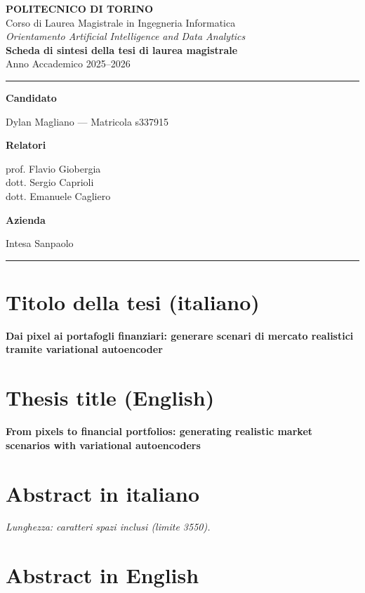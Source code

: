\documentclass[11pt,a4paper]{article}
\newcommand{\campo}[2]{%
  \par\noindent\parbox[t]{0.30\textwidth}{\raggedright\bfseries #1}%
  \parbox[t]{0.68\textwidth}{\raggedright #2}\par\medskip}
\begin{document}
\begin{center}
  {\Large\bfseries\color{polito} POLITECNICO DI TORINO}\\[0.35em]
  {\normalsize Corso di Laurea Magistrale in Ingegneria Informatica}\\
  {\small\itshape Orientamento Artificial Intelligence and Data Analytics}\\[1.2em]
  {\large\bfseries Scheda di sintesi della tesi di laurea magistrale}\\[0.4em]
  {\small Anno Accademico 2025--2026}
\end{center}

\vspace{0.6em}
\noindent\textcolor{rulegray}{\rule{\textwidth}{0.8pt}}
\vspace{0.4em}

\campo{Candidato}{Dylan Magliano --- Matricola s337915}
\campo{Relatori}{prof. Flavio Giobergia\\ dott. Sergio Caprioli\\ dott. Emanuele Cagliero}
\campo{Azienda}{Intesa Sanpaolo}

\noindent\textcolor{rulegray}{\rule{\textwidth}{0.8pt}}

\section{Titolo della tesi (italiano)}

\textbf{Dai pixel ai portafogli finanziari: generare scenari di mercato
realistici tramite variational autoencoder}

\section{Thesis title (English)}

\textbf{From pixels to financial portfolios: generating realistic market
scenarios with variational autoencoders}

\section{Abstract in italiano}

{\small\itshape Lunghezza: \unskip{} caratteri spazi
inclusi (limite 3550).\par}
\vspace{0.4em}



\section{Abstract in English}
\end{document}
